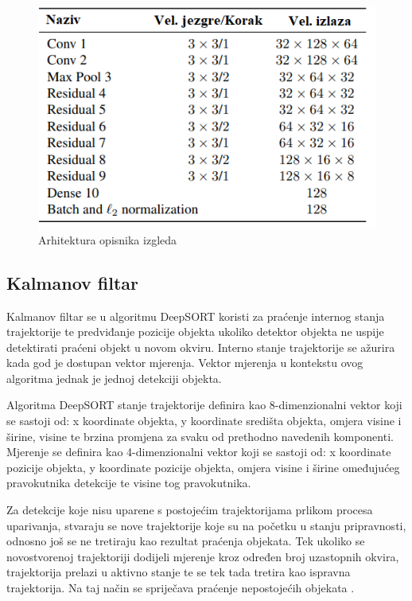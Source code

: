\documentclass[times, utf8, seminar, numeric]{fer}
\begin{document}
\begin{figure}
	\centering
	\includegraphics[scale=0.5]{slike/deep_sort_net_arch.png}
	\caption {Arhitektura opisnika izgleda}
	\label{fig:deep_sort_net_arch}
\end{figure}


\subsection{Kalmanov filtar}

Kalmanov filtar se u algoritmu DeepSORT koristi za praćenje internog stanja trajektorije te predviđanje pozicije objekta ukoliko detektor objekta ne uspije detektirati praćeni objekt u novom okviru. Interno stanje trajektorije se ažurira kada god je dostupan vektor mjerenja. Vektor mjerenja u kontekstu ovog algoritma jednak je jednoj detekciji objekta. 

Algoritma DeepSORT stanje trajektorije definira kao 8-dimenzionalni vektor koji se sastoji od: x koordinate objekta, y koordinate središta objekta, omjera visine i širine, visine te brzina promjena za svaku od prethodno navedenih komponenti. Mjerenje se definira kao 4-dimenzionalni vektor koji se sastoji od: x koordinate pozicije objekta, y koordinate pozicije objekta, omjera visine i širine omeđujućeg pravokutnika detekcije te visine tog pravokutnika. 


Za detekcije koje nisu uparene s postojećim trajektorijama prlikom procesa uparivanja, stvaraju se nove trajektorije koje su na početku u stanju pripravnosti, odnosno još se ne tretiraju kao rezultat praćenja objekata. Tek ukoliko se novostvorenoj trajektoriji dodijeli mjerenje kroz određen broj uzastopnih okvira, trajektorija prelazi u aktivno stanje te se tek tada tretira kao ispravna trajektorija. Na taj način se spriječava praćenje nepostojećih objekata \cite{deepsort}.
\end{document}
